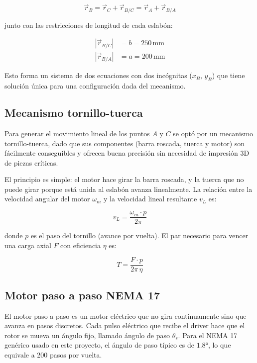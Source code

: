 \begin{equation}
	\vec{r}_B = \vec{r}_C + \vec{r}_{B/C} = \vec{r}_A + \vec{r}_{B/A}
\end{equation}

junto con las restricciones de longitud de cada eslabón:

\begin{align}
	|\vec{r}_{B/C}| &= b = 250\,\text{mm} \\
	|\vec{r}_{B/A}| &= a = 200\,\text{mm}
\end{align}

Esto forma un sistema de dos ecuaciones con dos incógnitas ($x_B$, $y_B$) que tiene
solución única para una configuración dada del mecanismo.

\subsection{Mecanismo tornillo-tuerca}

Para generar el movimiento lineal de los puntos $A$ y $C$ se optó por un mecanismo
tornillo-tuerca, dado que sus componentes (barra roscada, tuerca y motor) son fácilmente
conseguibles y ofrecen buena precisión sin necesidad de impresión 3D de piezas críticas.

El principio es simple: el motor hace girar la barra roscada, y la tuerca que no puede
girar porque está unida al eslabón avanza linealmente. La relación entre la velocidad
angular del motor $\omega_m$ y la velocidad lineal resultante $v_L$ es:

\begin{equation}
	v_L = \frac{\omega_m \cdot p}{2\pi}
\end{equation}

donde $p$ es el paso del tornillo (avance por vuelta). El par necesario para vencer una
carga axial $F$ con eficiencia $\eta$ es:

\begin{equation}
	T = \frac{F \cdot p}{2\pi\,\eta}
\end{equation}

\subsection{Motor paso a paso NEMA 17}

El motor paso a paso es un motor eléctrico que no gira continuamente sino que avanza en
pasos discretos. Cada pulso eléctrico que recibe el driver hace que el rotor se mueva un
ángulo fijo, llamado ángulo de paso $\theta_s$. Para el NEMA 17 genérico usado en este
proyecto, el ángulo de paso típico es de $1.8°$, lo que equivale a 200 pasos por vuelta.

